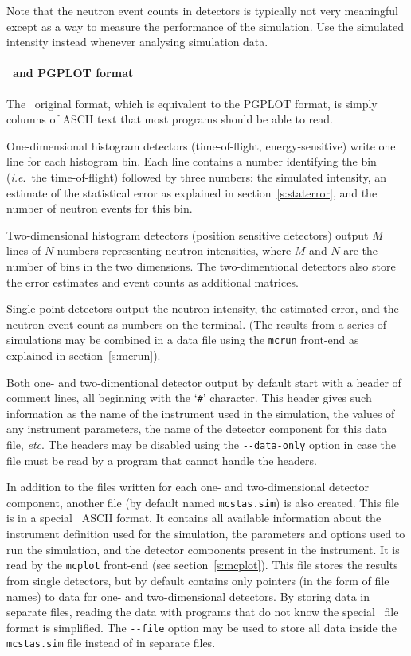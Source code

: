 Note that the neutron event counts in detectors is typically not very
meaningful except as a way to measure the performance of the
simulation. Use the simulated intensity instead whenever analysing
simulation data.

\paragraph{\MCS\ and PGPLOT format}

The \MCS\ original format, which is equivalent to the PGPLOT format, is simply columns of ASCII text that most programs should
be able to read. 

One-dimensional histogram detectors (time-of-flight, energy-sensitive)
write one line for each histogram bin. Each line contains a number
identifying the bin (\textit{i.e}.\ the time-of-flight) followed by
three numbers: the simulated intensity, an estimate of the statistical
error as explained in section~\ref{s:staterror}, and the number of
neutron events for this bin.

Two-dimensional histogram detectors (position sensitive detectors)
output $M$ lines of $N$ numbers representing neutron intensities, where
$M$ and $N$ are the number of bins in the two dimensions. The
two-dimentional detectors also store the error estimates and event counts as additional matrices.

Single-point detectors output the neutron intensity, the estimated
error, and the neutron event count as numbers on the
terminal. (The results from a series of simulations may be combined in a
data file using the \verb+mcrun+ front-end as explained in
section~\ref{s:mcrun}).

Both one- and two-dimentional detector output by default start with a
header of comment lines, all beginning with the `\verb+#+' character.
This header gives such information as the name of the instrument used in
the simulation, the values of any instrument parameters, the name of the
detector component for this data file, \textit{etc}. The headers may be
disabled using the \verb+--data-only+ option in case the file must be
read by a program that cannot handle the headers.

In addition to the files written for each one- and two-dimensional
detector component, another file (by default named \verb+mcstas.sim+) is
also created. This file is in a special \MCS\ ASCII format. It contains
all available information about the instrument definition used for the
simulation, the parameters and options used to run the simulation, and
the detector components present in the instrument. It is read by the
\verb+mcplot+ front-end (see section~\ref{s:mcplot}). This file stores
the results from single detectors, but by default contains only pointers
(in the form of file names) to data for one- and two-dimensional
detectors. By storing data in separate files, reading the data with
programs that do not know the special \MCS\ file format is
simplified. The \verb+--file+ option may be used to store all data
inside the \verb+mcstas.sim+ file instead of in separate files.

